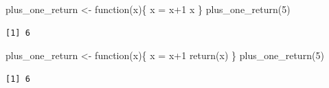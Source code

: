 \documentclass[
  ignorenonframetext,
]{beamer}
\newenvironment{Shaded}{\begin{snugshade}}{\end{snugshade}}
\newcommand{\ControlFlowTok}[1]{\textcolor[rgb]{0.00,0.23,0.31}{#1}}
\newcommand{\DecValTok}[1]{\textcolor[rgb]{0.68,0.00,0.00}{#1}}
\newcommand{\FunctionTok}[1]{\textcolor[rgb]{0.28,0.35,0.67}{#1}}
\newcommand{\NormalTok}[1]{\textcolor[rgb]{0.00,0.23,0.31}{#1}}
\newcommand{\OtherTok}[1]{\textcolor[rgb]{0.00,0.23,0.31}{#1}}
\newcommand{\SpecialCharTok}[1]{\textcolor[rgb]{0.37,0.37,0.37}{#1}}
\begin{document}
\begin{frame}[fragile]
\begin{Shaded}
\begin{Highlighting}[]
\NormalTok{plus\_one\_return }\OtherTok{\textless{}{-}} \ControlFlowTok{function}\NormalTok{(x)\{}
\NormalTok{  x }\OtherTok{=}\NormalTok{ x}\SpecialCharTok{+}\DecValTok{1}
\NormalTok{  x}
\NormalTok{\}}
\FunctionTok{plus\_one\_return}\NormalTok{(}\DecValTok{5}\NormalTok{)}
\end{Highlighting}
\end{Shaded}

\begin{verbatim}
[1] 6
\end{verbatim}

\begin{Shaded}
\begin{Highlighting}[]
\NormalTok{plus\_one\_return }\OtherTok{\textless{}{-}} \ControlFlowTok{function}\NormalTok{(x)\{}
\NormalTok{  x }\OtherTok{=}\NormalTok{ x}\SpecialCharTok{+}\DecValTok{1}
  \FunctionTok{return}\NormalTok{(x)}
\NormalTok{\}}
\FunctionTok{plus\_one\_return}\NormalTok{(}\DecValTok{5}\NormalTok{)}
\end{Highlighting}
\end{Shaded}

\begin{verbatim}
[1] 6
\end{verbatim}
\end{frame}
\end{document}
